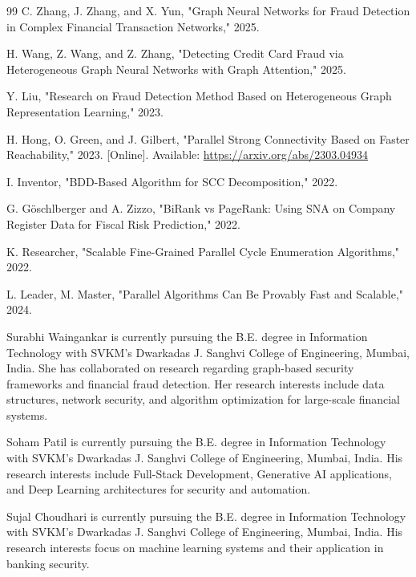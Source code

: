 \documentclass[lettersize,journal]{IEEEtran}
\begin{document}
\begin{thebibliography}{99}
 C. Zhang, J. Zhang, and X. Yun, "Graph Neural Networks for Fraud Detection in Complex Financial Transaction Networks," 2025.

 H. Wang, Z. Wang, and Z. Zhang, "Detecting Credit Card Fraud via Heterogeneous Graph Neural Networks with Graph Attention," 2025.

 Y. Liu, "Research on Fraud Detection Method Based on Heterogeneous Graph Representation Learning," 2023.

 H. Hong, O. Green, and J. Gilbert, "Parallel Strong Connectivity Based on Faster Reachability," 2023. [Online]. Available: \url{https://arxiv.org/abs/2303.04934}

 I. Inventor, "BDD-Based Algorithm for SCC Decomposition," 2022.

 G. Göschlberger and A. Zizzo, "BiRank vs PageRank: Using SNA on Company Register Data for Fiscal Risk Prediction," 2022.

 K. Researcher, "Scalable Fine-Grained Parallel Cycle Enumeration Algorithms," 2022.

 L. Leader, M. Master, "Parallel Algorithms Can Be Provably Fast and Scalable," 2024.

\end{thebibliography}


\begin{IEEEbiographynophoto}{Surabhi Waingankar}
is currently pursuing the B.E. degree in Information Technology with SVKM's Dwarkadas J. Sanghvi College of Engineering, Mumbai, India. She has collaborated on research regarding graph-based security frameworks and financial fraud detection. Her research interests include data structures, network security, and algorithm optimization for large-scale financial systems.
\end{IEEEbiographynophoto}

\begin{IEEEbiographynophoto}{Soham Patil}
is currently pursuing the B.E. degree in Information Technology with SVKM's Dwarkadas J. Sanghvi College of Engineering, Mumbai, India. His research interests include Full-Stack Development, Generative AI applications, and Deep Learning architectures for security and automation.
\end{IEEEbiographynophoto}

\begin{IEEEbiographynophoto}{Sujal Choudhari}
is currently pursuing the B.E. degree in Information Technology with SVKM's Dwarkadas J. Sanghvi College of Engineering, Mumbai, India. His research interests focus on machine learning systems and their application in banking security.
\end{IEEEbiographynophoto}
\end{document}
